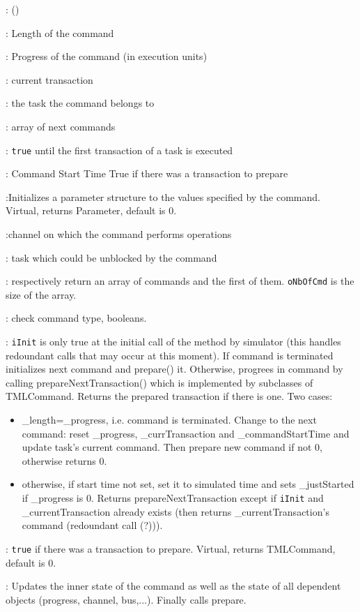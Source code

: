 \documentclass[a4paper,11pt]{article}
\newcommand{\bfont}{\fontseries{b}\selectfont}
\newcommand{\cod}[1]{{\ttfamily #1}}
\newcommand{\class}[2]{\par\vspace{1mm}\hspace{-5mm}\large\colorbox{file}{\textbullet\bfont\cod{#1}:} (\cod{#2})\par}
\newcommand{\method}[1]{\par\vspace{1mm}\hspace{-2mm}\colorbox{method}{\textopenbullet\bfont\cod{#1}:}}
\newcommand{\variable}[1]{\par\vspace{1mm}\hspace{-2mm}\colorbox{variable}{\textopenbullet\bfont\cod{#1}:}}
\begin{document}
\class{TMLCommand}{}
\variable{\_length} Length of the command
\variable{\_progress} Progress of the command (in execution units)
\variable{\_currTransaction} current transaction 
\variable{\_task} the task the command belongs to
\variable{\_nextCommand} array of  next commands
\variable{\_justStarted} {\tt true} until the first transaction of a task is executed
\variable{\_commandStartTime} Command Start Time
True if there was a transaction to prepare
\method{setParams(ioParam)}Initializes a parameter structure to the values specified by the command. Virtual, returns  Parameter, default is 0.
\method{getChannel(iIndex)}channel on which the command performs operations
\method{getDependentTask(iIndex)} task which could be unblocked by the command
\method{getNextCommands(oNbOfCmd), getNextCommand()} respectively return an array of commands and the first of them. {\tt oNbOfCmd} is the size of the array.
\method{isDelayTransaction(), getActiveDelay()} check command type, booleans.
\method{prepare(iInit)} {\tt iInit} is only true at the initial call of the method by simulator (this handles redoundant calls that may occur at this moment). If command is terminated initializes next command and \cod{prepare()} it. Otherwise, progrees in command by calling \cod{prepareNext\-Transaction()} which is implemented by subclasses of TMLCommand. Returns the prepared transaction if there is one. Two cases:
\begin{itemize}
	\item \cod{\_length}=\cod{\_progress}, i.e. command is terminated. Change to the next command: reset \cod{\_progress}, 
	\cod{\_currTransaction} and \cod{\_commandStartTime} and update task's current command. Then prepare new command if not 0, otherwise returns 0.
	\item otherwise, if start time not set, set it to simulated time and sets \cod{\_justStarted} if \cod{\_progress} is 0. Returns \cod{prepareNextTransaction} except if {\tt iInit} and \cod{\_current\-Transaction} already exists (then returns \cod{\_currentTransaction}'s command (redoundant call (?))).
\end{itemize}
\method{prepareNextTransaction()} {\tt true} if there was a transaction to prepare. Virtual, returns  TMLCommand, default is 0.
\method{execute()} Updates the inner state of the command as well as the state of all dependent objects (progress, channel, bus,...). Finally calls \cod{prepare}.
\end{document}
